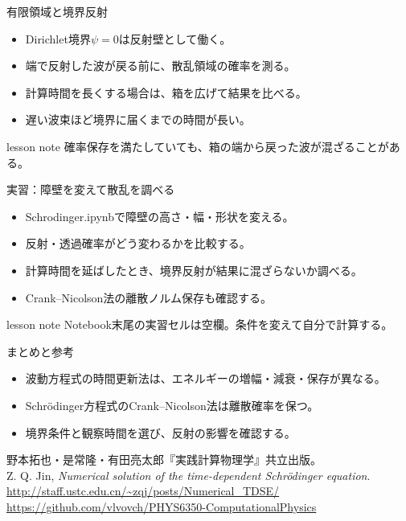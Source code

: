 \documentclass[12pt,aspectratio=43]{beamer}
\newcommand{\code}[1]{{\codefont #1}}
\newenvironment{lessonbox}
  {\begin{beamercolorbox}[wd=\linewidth,sep=1.5mm]{lesson note}}
  {\end{beamercolorbox}\par}
\begin{document}
\begin{frame}[t]{有限領域と境界反射}
  \begin{itemize}
    \setlength{\itemsep}{3mm}
    \item Dirichlet境界\(\psi=0\)は反射壁として働く。
    \item 端で反射した波が戻る前に、散乱領域の確率を測る。
    \item 計算時間を長くする場合は、箱を広げて結果を比べる。
    \item 遅い波束ほど境界に届くまでの時間が長い。
  \end{itemize}
  \vfill
  \begin{lessonbox}
    確率保存を満たしていても、箱の端から戻った波が混ざることがある。
  \end{lessonbox}
\end{frame}

\begin{frame}[t]{実習：障壁を変えて散乱を調べる}
  \begin{itemize}
    \item \code{Schrodinger.ipynb}で障壁の高さ・幅・形状を変える。
    \item 反射・透過確率がどう変わるかを比較する。
    \item 計算時間を延ばしたとき、境界反射が結果に混ざらないか調べる。
    \item Crank--Nicolson法の離散ノルム保存も確認する。
  \end{itemize}
  \vfill
  \begin{lessonbox}
    Notebook末尾の実習セルは空欄。条件を変えて自分で計算する。
  \end{lessonbox}
\end{frame}

\begin{frame}[t]{まとめと参考}
  \begin{itemize}
    \item 波動方程式の時間更新法は、エネルギーの増幅・減衰・保存が異なる。
    \item Schrödinger方程式のCrank--Nicolson法は離散確率を保つ。
    \item 境界条件と観察時間を選び、反射の影響を確認する。
  \end{itemize}
  \vfill
  {\footnotesize
    野本拓也・是常隆・有田亮太郎『実践計算物理学』共立出版。\\
    Z. Q. Jin, \emph{Numerical solution of the time-dependent Schrödinger equation}.\\
    \url{http://staff.ustc.edu.cn/~zqj/posts/Numerical_TDSE/}\\
    \url{https://github.com/vlvovch/PHYS6350-ComputationalPhysics}}
\end{frame}
\end{document}
